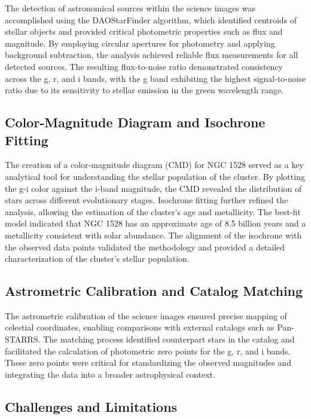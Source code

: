 \documentclass[linenumbers,twocolumn]{aastex631}
\begin{document}
The detection of astronomical sources within the science images was accomplished using the DAOStarFinder algorithm, which identified centroids of stellar objects and provided critical photometric properties such as flux and magnitude. By employing circular apertures for photometry and applying background subtraction, the analysis achieved reliable flux measurements for all detected sources. The resulting flux-to-noise ratio demonstrated consistency across the g, r, and i bands, with the g band exhibiting the highest signal-to-noise ratio due to its sensitivity to stellar emission in the green wavelength range.

\subsection{Color-Magnitude Diagram and Isochrone Fitting}

The creation of a color-magnitude diagram (CMD) for NGC 1528 served as a key analytical tool for understanding the stellar population of the cluster. By plotting the g-i color against the i-band magnitude, the CMD revealed the distribution of stars across different evolutionary stages. Isochrone fitting further refined the analysis, allowing the estimation of the cluster’s age and metallicity. The best-fit model indicated that NGC 1528 has an approximate age of 8.5 billion years and a metallicity consistent with solar abundance. The alignment of the isochrone with the observed data points validated the methodology and provided a detailed characterization of the cluster's stellar population.

\subsection{Astrometric Calibration and Catalog Matching}

The astrometric calibration of the science images ensured precise mapping of celestial coordinates, enabling comparisons with external catalogs such as Pan-STARRS. The matching process identified counterpart stars in the catalog and facilitated the calculation of photometric zero points for the g, r, and i bands. These zero points were critical for standardizing the observed magnitudes and integrating the data into a broader astrophysical context.

\subsection{Challenges and Limitations}
\end{document}
